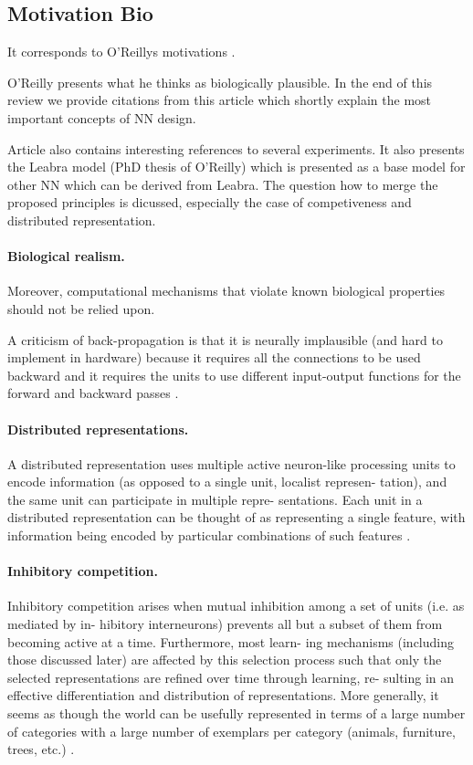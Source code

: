 \subsection*{Motivation Bio}

It corresponds to O'Reillys motivations \cite{o1998six}.

O'Reilly presents what he thinks as biologically plausible. In the end of this review we provide citations from this article which shortly explain the most important concepts of NN design. 

Article also contains interesting references to several experiments. It also presents the Leabra model (PhD thesis of O'Reilly) which is presented as a base model for other NN which can be derived from Leabra. The question how to merge the proposed principles is dicussed, especially the case of competiveness and distributed representation. 

\paragraph{Biological realism.} Moreover, computational mechanisms that violate
known biological properties should not be relied upon. 

A criticism of back-propagation is that it is neurally implausible (and hard to implement in hardware) because it requires all the connections to be used backward and it requires the units to use different input-output functions for the forward and backward passes \cite{hinton1988learning}.

\paragraph{Distributed representations.} A distributed representation
uses multiple active neuron-like processing units to encode
information (as opposed to a single unit, localist represen-
tation), and the same unit can participate in multiple repre-
sentations. Each unit in a distributed representation can be
thought of as representing a single feature, with information
being encoded by particular combinations of such features \cite{hinton1988learning}.


\paragraph{Inhibitory competition.} Inhibitory competition arises when mutual
inhibition among a set of units (i.e. as mediated by in-
hibitory interneurons) prevents all but a subset of them
from becoming active at a time.  Furthermore, most learn-
ing mechanisms (including those discussed later) are
affected by this selection process such that only the selected
representations are refined over time through learning, re-
sulting in an effective differentiation and distribution of
representations. More generally, it seems as though the world can be usefully
represented in terms of a large number of categories with a
large number of exemplars per category (animals, furniture,
trees, etc.) \cite{hinton1988learning}. 

